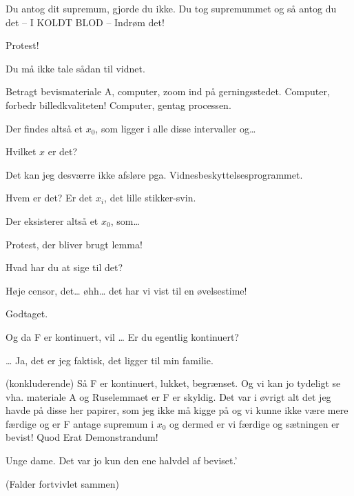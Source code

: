 \documentclass[a4paper,11pt]{article}
\begin{document}
\begin{sketch}
 Du antog dit supremum, gjorde du ikke. Du tog supremummet og så antog du det – I KOLDT BLOD – Indrøm det!

 Protest! 

 Du må ikke tale sådan til vidnet.

 Betragt bevismateriale A, computer, zoom ind på gerningsstedet. Computer, forbedr billedkvaliteten! Computer, gentag processen.


 Der findes altså et $x_0$, som ligger i alle disse intervaller og…

 Hvilket $x$ er det?

 Det kan jeg desværre ikke afsløre pga. Vidnesbeskyttelsesprogrammet.

 Hvem er det? Er det $x_i$, det lille stikker-svin.

 Der eksisterer altså et $x_0$, som…

 Protest, der bliver brugt lemma!

 Hvad har du at sige til det?

 Høje censor, det… øhh… det har vi vist til en øvelsestime!

 Godtaget.


 Og da F er kontinuert, vil … Er du egentlig kontinuert?

 … Ja, det er jeg faktisk, det ligger til min familie.

 (konkluderende) Så F er kontinuert, lukket, begrænset. Og vi kan jo tydeligt se vha. materiale A og Ruselemmaet er F er skyldig. Det var i øvrigt alt det jeg havde på disse her papirer, som jeg ikke må kigge på og vi kunne ikke være mere færdige og er F antage supremum i $x_0$ og dermed er vi færdige og sætningen er bevist! Quod Erat Demonstrandum!

 Unge dame. Det var jo kun den ene halvdel af beviset.'

 (Falder fortvivlet sammen)

\end{sketch}
\end{document}
